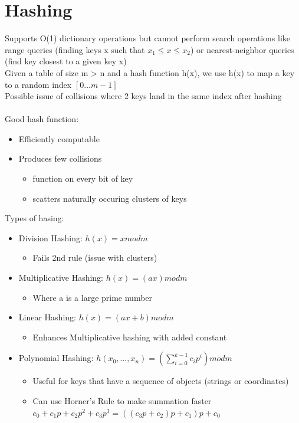 \documentclass{article}
\begin{document}
  \section{Hashing}
  Supports O(1) dictionary operations but cannot perform search operations like range queries (finding keys x such that $x_{1} \leq x \leq x_{2}$) or nearest-neighbor queries (find key closest to a given key x)\\
  Given a table of size m > n and a hash function h(x), we use h(x) to map a key to a random index $[0...m-1]$ \\
  Possible issue of collisions where 2 keys land in the same index after hashing\\ \\
  Good hash function:
  \begin{itemize}[noitemsep]
  \item Efficiently computable
  \item Produces few collisions
    \begin{itemize}[noitemsep]
      \item function on every bit of key 
      \item scatters naturally occuring clusters of keys \\
    \end{itemize}
  \end{itemize}
  Types of hasing:
  \begin{itemize}[noitemsep]
  \item Division Hashing: $h(x) = x mod m$
    \begin{itemize}[noitemsep]
      \item Fails 2nd rule (issue with clusters)
    \end{itemize}
  \item Multiplicative Hashing: $h(x) = (ax) mod m$
  \begin{itemize}
    \item Where a is a large prime number
  \end{itemize}
  \item Linear Hashing: $h(x) = (ax + b) mod m$
  \begin{itemize}
      \item Enhances Multiplicative hashing with added constant
  \end{itemize}
  \item Polynomial Hashing: $h(x_{0}, ..., x_{n}) = (\sum_{i=0}^{k-1}c_{i}p^{i}) mod m$
    \begin{itemize}
      \item Useful for keys that have a sequence of objects (strings or coordinates)
      \item Can use Horner's Rule to make summation faster $c_{0} + c_{1}p + c_{2}p^{2} + c_{3}p^{3} = ((c_{3}p + c_{2})p + c_{1})p + c_{0}$ \\
    \end{itemize}
  \end{itemize}
\end{document}

